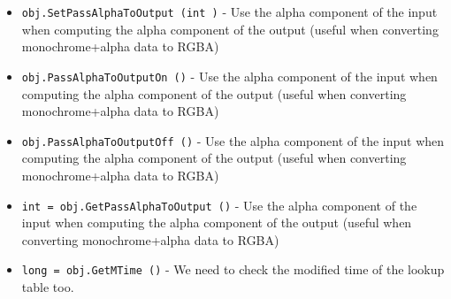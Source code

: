 \begin{itemize}
\item  \verb|obj.SetPassAlphaToOutput (int )| -  Use the alpha component of the input when computing the alpha component
 of the output (useful when converting monochrome+alpha data to RGBA)

\item  \verb|obj.PassAlphaToOutputOn ()| -  Use the alpha component of the input when computing the alpha component
 of the output (useful when converting monochrome+alpha data to RGBA)

\item  \verb|obj.PassAlphaToOutputOff ()| -  Use the alpha component of the input when computing the alpha component
 of the output (useful when converting monochrome+alpha data to RGBA)

\item  \verb|int = obj.GetPassAlphaToOutput ()| -  Use the alpha component of the input when computing the alpha component
 of the output (useful when converting monochrome+alpha data to RGBA)

\item  \verb|long = obj.GetMTime ()| -  We need to check the modified time of the lookup table too.

\end{itemize}
